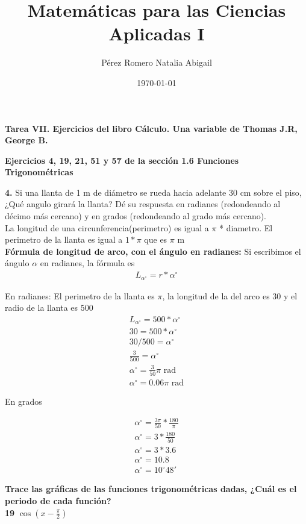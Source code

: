 \documentclass[12pt, letterpaper]{article}
\title{Matemáticas para las Ciencias Aplicadas I}
\author{Pérez Romero Natalia Abigail}
\date{\today}
\begin{document}
\maketitle
\textbf{Tarea VII. Ejercicios del libro Cálculo. Una variable de Thomas J.R, George B.}

\textbf{Ejercicios 4, 19, 21, 51 y 57  de  la sección 1.6 Funciones Trigonométricas}

\textbf{4.} Si una llanta de 1 m de diámetro se rueda hacia adelante 30 cm sobre el piso, ¿Qué angulo girará la llanta? Dé su respuesta en radianes (redondeando al décimo más cercano) y en grados (redondeando al grado más cercano).\\

La longitud de una circunferencia(perimetro) es  igual a $\pi$ * diametro. El perimetro de la llanta es igual a $1 * \pi$ que es $\pi$ m\\

\textbf{Fórmula de longitud de arco, con el ángulo en radianes:}
Si escribimos el ángulo $\alpha$ en radianes, la fórmula es
\begin{align*}
	L_{\alpha ^{\circ}}= r * \alpha^{\circ}
\end{align*}

En radianes:
El perimetro de la llanta es $ \pi $, la longitud de la del arco es $30$ y el radio de la llanta es $ 500 $
\begin{align*}
	L_{\alpha ^{\circ}} = 500 * \alpha^{\circ}\\
	30 = 500 * \alpha^{\circ}\\
	30/500 = \alpha^{\circ}\\
	\frac{3}{500} = \alpha^{\circ}\\
	\alpha^{\circ}  = \frac{3}{50} \pi \text{ rad}\\
	\alpha^{\circ}  = 0.06 \pi \text{ rad}
\end{align*}


En grados

\begin{align*}
	\alpha^{\circ} = \frac{3\pi}{50} * \frac{180}{\pi}\\
	\alpha^{\circ} = 3* \frac{180}{50}\\
	\alpha^{\circ} = 3*3.6\\
	\alpha^{\circ} = 10.8\\
	\alpha^{\circ} = 10^{\circ} 48'
\end{align*}

\textbf{Trace las gráficas de las funciones trigonométricas dadas, ¿Cuál es el periodo de cada función?}\\
\textbf{19} $\cos (x - \frac{\pi}{2})$
\end{document}
